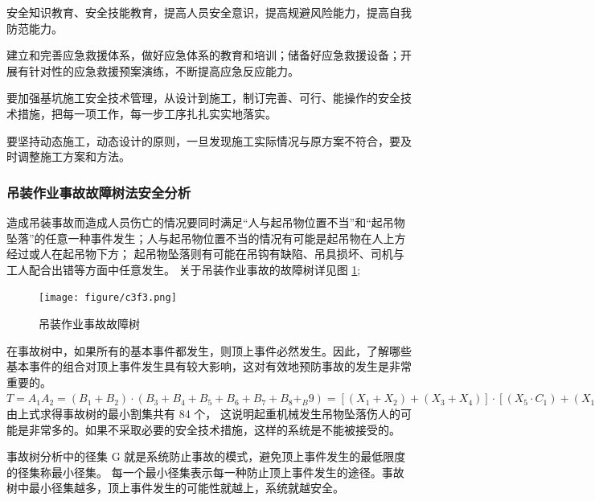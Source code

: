  安全知识教育、安全技能教育，提高人员安全意识，提高规避风险能力，提高自我防范能力。

 建立和完善应急救援体系，做好应急体系的教育和培训；储备好应急救援设备；开展有针对性的应急救援预案演练，不断提高应急反应能力。

 要加强基坑施工安全技术管理，从设计到施工，制订完善、可行、能操作的安全技术措施，把每一项工作，每一步工序扎扎实实地落实。

 要坚持动态施工，动态设计的原则，一旦发现施工实际情况与原方案不符合，要及时调整施工方案和方法。


\subsubsection{吊装作业事故故障树法安全分析}

造成吊装事故而造成人员伤亡的情况要同时满足“人与起吊物位置不当”和“起吊物坠落”的任意一种事件发生；人与起吊物位置不当的情况有可能是起吊物在人上方经过或人在起吊物下方；
起吊物坠落则有可能在吊钩有缺陷、吊具损坏、司机与工人配合出错等方面中任意发生。
关于吊装作业事故的故障树详见图 \ref{fig:c3f3};

\begin{landscape}
\begin{figure}[thbp!]
    \centering
    \texttt{[image: figure/c3f3.png]}
    \caption{吊装作业事故故障树}
    \label{fig:c3f3}
\end{figure}
\end{landscape}

在事故树中，如果所有的基本事件都发生，则顶上事件必然发生。因此，了解哪些基本事件的组合对顶上事件发生具有较大影响，这对有效地预防事故的发生是非常重要的。\\

$T=A_1A_2=(B_1+B_2)·(B_3+B_4+B_5+B_6+B_7+B_8+_B9)=[(X_1+X_2)+(X_3+X_4)]·[(X_5·C_1)+(X_{15}+C_2)+(X_{18}+X_{19})+(X_{20}+X_{21}+C_3)+(X_{24}·X_{25})+(X_{26}+X_{27})+(X_{28}+X_{29})]
=(X_1+X_2+X_3+X_4)·[X_5·(D_1+D_2+D_3)+X_{15}+(X_{16}+X_{17})+(X_{18}+X_{19})+X_{20}+X_{21}+
(X_{22}+X_{23})+X_{24}·X_{25}+X_{26}+X_{27}+X_{28}+X_{29}]
=(X_1+X_2+X_3+X_4)·[X_3·(X_6+X_7+X_8+X_9+X_{10}+X_{11}+X_{12}+X_{13}·X_{14}+X_{15}+X_{16}+X_{17}+X_{18}+X_{19}
+X_{20}+X_{21}+X_{22}+X_{23}+X_{24}+X_{25}+X_{26}+X_{27}+X_{28})]$\\

由上式求得事故树的最小割集共有 84 个，
这说明起重机械发生吊物坠落伤人的可能是非常多的。如果不采取必要的安全技术措施，这样的系统是不能被接受的。

事故树分析中的径集 G 就是系统防止事故的模式，避免顶上事件发生的最低限度的径集称最小径集。
每一个最小径集表示每一种防止顶上事件发生的途径。事故树中最小径集越多，顶上事件发生的可能性就越上，系统就越安全。\\


